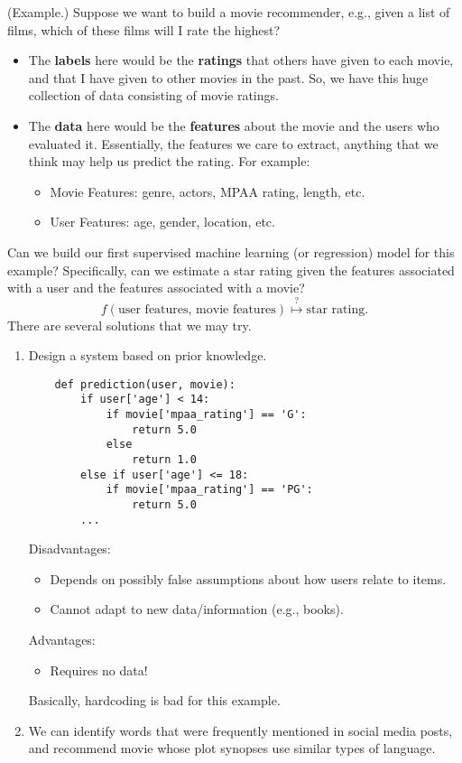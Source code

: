 \documentclass[letterpaper]{article}
\begin{document}
\begin{mdframed}[]
    (Example.) Suppose we want to build a movie recommender, e.g., given a list of films, which of these films will I rate the highest?
    \begin{itemize}
        \item The \textbf{labels} here would be the \textbf{ratings} that others have given to each movie, and that I have given to other movies in the past. So, we have this huge collection of data consisting of movie ratings.
        \item The \textbf{data} here would be the \textbf{features} about the movie and the users who evaluated it. Essentially, the features we care to extract, anything that we think may help us predict the rating. For example:
        \begin{itemize}
            \item Movie Features: genre, actors, MPAA rating, length, etc.
            \item User Features: age, gender, location, etc. 
        \end{itemize}
    \end{itemize}
    Can we build our first supervised machine learning (or regression) model for this example? Specifically, can we estimate a star rating given the features associated with a user and the features associated with a movie? 
    \[f(\text{user features, movie features}) \overset{?}{\mapsto} \text{star rating}.\]
    There are several solutions that we may try. 
    \begin{enumerate}
        \item Design a system based on prior knowledge.\begin{verbatim}
    def prediction(user, movie):
        if user['age'] < 14:
            if movie['mpaa_rating'] == 'G':
                return 5.0
            else 
                return 1.0
        else if user['age'] <= 18:
            if movie['mpaa_rating'] == 'PG':
                return 5.0
        ...\end{verbatim}
        
        \begin{mdframed}[]
            Disadvantages:
            \begin{itemize}
                \item Depends on possibly false assumptions about how users relate to items. 
                \item Cannot adapt to new data/information (e.g., books).
            \end{itemize}
            Advantages:
            \begin{itemize}
                \item Requires no data!
            \end{itemize}
            Basically, hardcoding is bad for this example.
        \end{mdframed}
        \item We can identify words that were frequently mentioned in social media posts, and recommend movie whose plot synopses use similar types of language. 
        

\end{enumerate}
\end{mdframed}
\end{document}
